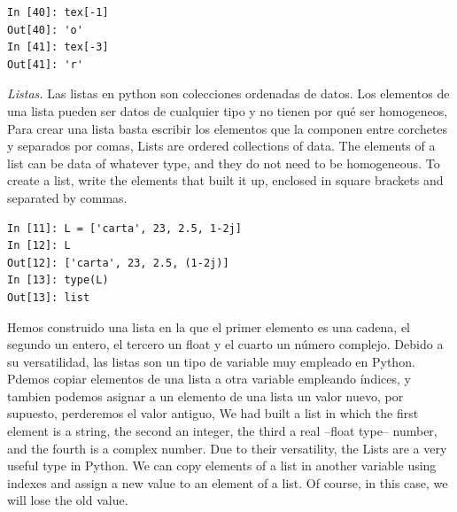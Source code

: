 \begin{center}
    \begin{minipage}{0.3\textwidth}
\begin{verbatim}
In [40]: tex[-1]
Out[40]: 'o'
In [41]: tex[-3]
Out[41]: 'r'
\end{verbatim}
\end{minipage}
\end{center}

\begin{paracol}{2}
\emph{Listas.} Las listas en python son colecciones ordenadas de datos. Los elementos de una lista pueden ser datos de cualquier tipo y no tienen por qué ser homogeneos, Para crear una lista basta escribir los elementos que la componen entre corchetes y separados por comas,
\switchcolumn
Lists are ordered collections of data. The elements of a list can be data of whatever type, and they do not need to be homogeneous. To create a list, write the elements that built it up, enclosed in square brackets and separated by commas.  
\end{paracol}

\begin{center}
    \begin{minipage}{0.4\textwidth}
\begin{verbatim}
In [11]: L = ['carta', 23, 2.5, 1-2j]
In [12]: L
Out[12]: ['carta', 23, 2.5, (1-2j)]
In [13]: type(L)
Out[13]: list
\end{verbatim}
\end{minipage}
\end{center}

\begin{paracol}{2}
Hemos construido una lista en la que el primer elemento es una cadena, el segundo un entero, el tercero un float y el cuarto un número complejo. Debido a su versatilidad, las listas son un tipo de variable muy empleado en Python. Pdemos copiar elementos de una lista a otra variable empleando índices, y tambien podemos asignar a un elemento de una lista un valor nuevo, por supuesto, perderemos el valor antiguo,
\switchcolumn
We had built a list in which the first element is a string, the second an integer, the third a real --float type-- number, and the fourth is a complex number. Due to their versatility, the Lists are a very useful type in Python. We can copy elements of a list in another variable using indexes and assign a new value to an element of a list. Of course, in this case, we will lose the old value. 
\end{paracol}

